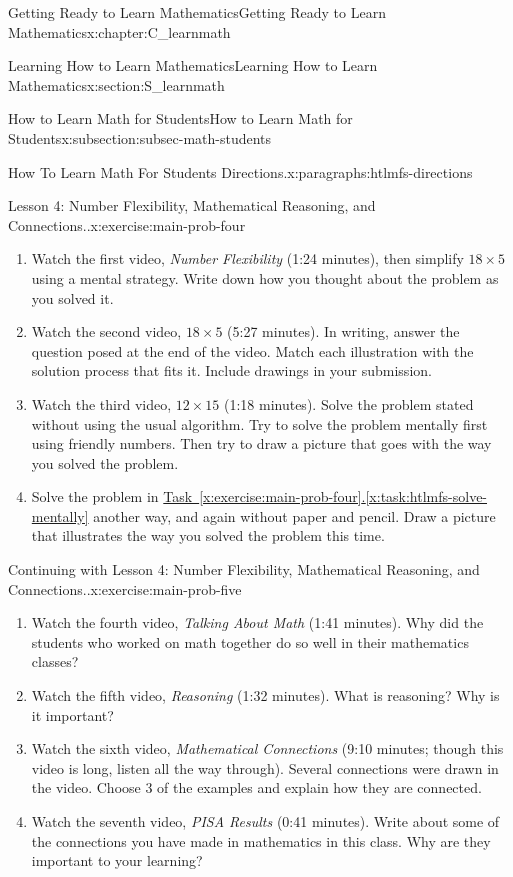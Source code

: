 \documentclass[oneside,10pt,]{book}
\newcommand{\xreffont}{\relax}
\newcommand{\pubtitle}[1]{\textsl{#1}}
\numberwithin{equation}{chapter}
\begin{document}
\begin{chapterptx}{Getting Ready to Learn Mathematics}{}{Getting Ready to Learn Mathematics}{}{}{x:chapter:C_learnmath}
\begin{sectionptx}{Learning How to Learn Mathematics}{}{Learning How to Learn Mathematics}{}{}{x:section:S_learnmath}
\begin{subsectionptx}{How to Learn Math for Students}{}{How to Learn Math for Students}{}{}{x:subsection:subsec-math-students}
\begin{paragraphs}{How To Learn Math For Students Directions.}{x:paragraphs:htlmfs-directions}
\begin{inlineexercise}{Lesson 4: Number Flexibility, Mathematical Reasoning, and Connections..}{x:exercise:main-prob-four}
\begin{enumerate}[font=\bfseries,label=(\alph*),ref=\alph*]
\item{}Watch the first video, \pubtitle{Number Flexibility} (1:24 minutes), then simplify \(18 \times 5\) using a mental strategy. Write down how you thought about the problem as you solved it.%
\item\label{x:task:htlmfs-185-illustrate}Watch the second video, \pubtitle{\(18 \times 5\)} (5:27 minutes). In writing, answer the question posed at the end of the video. Match each illustration with the solution process that fits it. Include drawings in your submission.%
\item\label{x:task:htlmfs-solve-mentally}Watch the third video, \pubtitle{\(12 \times 15\)} (1:18 minutes). Solve the problem stated without using the usual algorithm. Try to solve the problem mentally first using friendly numbers. Then try to draw a picture that goes with the way you solved the problem.%
\item\label{x:task:htlmfs-solve-again}Solve the problem in \hyperref[x:task:htlmfs-solve-mentally]{Task~{\xreffont\ref{x:exercise:main-prob-four}}.{\xreffont\ref{x:task:htlmfs-solve-mentally}}} another way, and again without paper and pencil. Draw a picture that illustrates the way you solved the problem this time.%
\end{enumerate}
\end{inlineexercise}%
\begin{inlineexercise}{Continuing with Lesson 4: Number Flexibility, Mathematical Reasoning, and Connections..}{x:exercise:main-prob-five}%
\begin{enumerate}[font=\bfseries,label=(\alph*),ref=\alph*]
\item{}Watch the fourth video, \pubtitle{Talking About Math} (1:41 minutes). Why did the students who worked on math together do so well in their mathematics classes?%
\item{}Watch the fifth video, \pubtitle{Reasoning} (1:32 minutes). What is reasoning? Why is it important?%
\item{}Watch the sixth video, \pubtitle{Mathematical Connections} (9:10 minutes; though this video is long, listen all the way through). Several connections were drawn in the video. Choose 3 of the examples and explain how they are connected.%
\item{}Watch the seventh video, \pubtitle{PISA Results} (0:41 minutes).  Write about some of the connections you have made in mathematics in this class. Why are they important to your learning?%

\end{enumerate}
\end{inlineexercise}
\end{paragraphs}
\end{subsectionptx}
\end{sectionptx}
\end{chapterptx}
\end{document}
